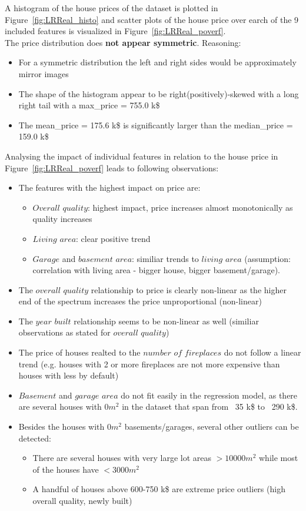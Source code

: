 \documentclass[11pt,a4paper]{article}
\begin{document}
A histogram of the house prices of the dataset is plotted in Figure~\ref{fig:LRReal_histo} and scatter plots of the house price over earch of the 9 included features
is visualized in Figure~\ref{fig:LRReal_poverf}.
\\ The price distribution does \textbf{not appear symmetric}. Reasoning:
\begin{itemize}[itemsep=0.1em]
  \item For a symmetric distribution the left and right sides would be approximately mirror images
  \item The shape of the histogram appear to be right(positively)-skewed with a long right tail with a max\_price = 755.0 k\$
  \item The mean\_price = 175.6 k\$ is significantly larger than the median\_price = 159.0 k\$
\end{itemize}

\noindent Analysing the impact of individual features in relation to the house price in Figure~\ref{fig:LRReal_poverf} leads to following observations:
\begin{itemize}[itemsep=0.1em]
  \item The features with the highest impact on price are:
  \begin{itemize}[itemsep=0.1em]
    \item $Overall$ $quality$: highest impact, price increases almost monotonically as quality increases
    \item $Living$ $area$: clear positive trend
    \item $Garage$ and $basement$ $area$: similiar trends to $living$ $area$ (assumption: correlation with living area - bigger house, bigger basement/garage).
  \end{itemize}
  \item The $overall$ $quality$ relationship to price is clearly non-linear as the higher end of the spectrum increases the price unproportional (non-linear)
  \item The $year$ $built$ relationship seems to be non-linear as well (similiar observations as stated for $overall$ $quality$)
  \item The price of houses realted to the $number$ $of$ $fireplaces$ do not follow a linear trend (e.g. houses with 2 or more fireplaces are not more expensive than houses with less by default)
  \item $Basement$ and $garage$ $area$ do not fit easily in the regression model, as there are several houses with 0$m^2$ in the dataset that span from ~35 k\$ to ~290 k\$.
  \item Besides the houses with 0$m^2$ basements/garages, several other outliers can be detected:
  \begin{itemize}[itemsep=0.1em]
    \item There are several houses with very large lot areas $>10000 m^2$ while most of the houses have $<3000 m^2$
    \item A handful of houses above 600-750 k\$ are extreme price outliers (high overall quality, newly built)
  \end{itemize}
\end{itemize}
\end{document}
